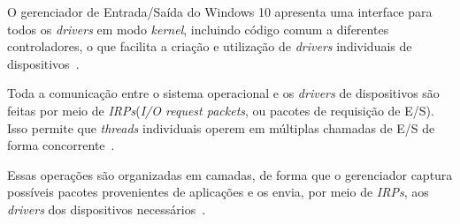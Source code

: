 O gerenciador de Entrada/Saída do Windows 10 apresenta uma interface para todos os \emph{drivers} em modo \emph{kernel}, incluindo código comum a diferentes controladores, o que facilita a criação e utilização de \emph{drivers} individuais de dispositivos~\cite{w10_io_manager, internals_pt2}.

Toda a comunicação entre o sistema operacional e os \emph{drivers} de dispositivos são feitas por meio de \emph{IRPs}(\emph{I/O request packets}, ou pacotes de requisição de E/S). Isso permite que \emph{threads} individuais operem em múltiplas chamadas de E/S de forma concorrente~\cite{internals_pt2}. 

Essas operações são organizadas em camadas, de forma que o gerenciador captura possíveis pacotes provenientes de aplicações e os envia, por meio de \emph{IRPs}, aos \emph{drivers} dos dispositivos necessários~\cite{w10_io_manager}.  


